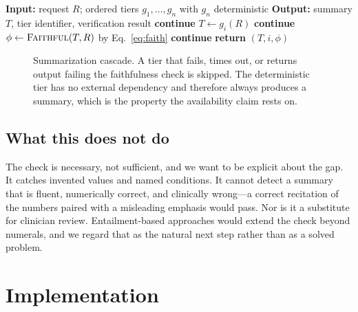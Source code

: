 \documentclass[lettersize,journal]{IEEEtran}
\begin{document}
\begin{algorithm}[t]
\caption{Verification-gated summarization cascade}
\label{alg:cascade}
\begin{algorithmic}[1]
\STATE \textbf{Input:} request $R$; ordered tiers $g_1, \dots, g_n$ with $g_n$
       deterministic
\STATE \textbf{Output:} summary $T$, tier identifier, verification result
    \STATE \textbf{continue}
  \ENDIF
  \STATE $T \leftarrow g_i(R)$ \hfill {}
    \STATE \textbf{continue} \hfill {}
  \ENDIF
  \STATE $\phi \leftarrow \textsc{Faithful}(T, R)$ by Eq.~\ref{eq:faith}
    \STATE \textbf{continue} \hfill {}
  \ENDIF
  \STATE \textbf{return} $(T, i, \phi)$
\ENDFOR
\end{algorithmic}
\end{algorithm}

\begin{figure}[t]
\centering

\caption{Summarization cascade. A tier that fails, times out, or returns output
failing the faithfulness check is skipped. The deterministic tier has no
external dependency and therefore always produces a summary, which is the
property the availability claim rests on.}
\label{fig:cascade}
\end{figure}

\subsection{What this does not do}

The check is necessary, not sufficient, and we want to be explicit about the
gap. It catches invented values and named conditions. It cannot detect a
summary that is fluent, numerically correct, and clinically wrong---a correct
recitation of the numbers paired with a misleading emphasis would pass. Nor is
it a substitute for clinician review. Entailment-based approaches
\cite{huang2025} would extend the check beyond numerals, and we regard that
as the natural next step rather than as a solved problem.

\section{Implementation}
\label{sec:impl}
\end{document}
